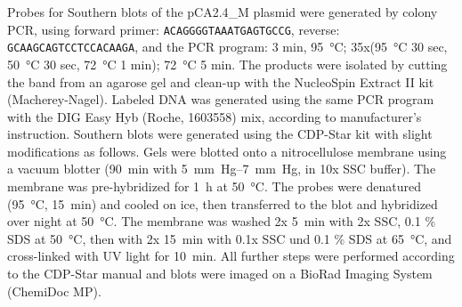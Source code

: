 \documentclass[10pt,a4]{article}
\newcommand{\remove}[1]{}
\begin{document}
Probes for Southern blots of the pCA2.4\_M plasmid were generated by
colony PCR, using forward primer: \texttt{ACAGGGGTAAATGAGTGCCG}, reverse:
\texttt{GCAAGCAGTCCTCCACAAGA}, and the PCR program: 3 min,
\SI{95}{\celsius}; 35x(\SI{95}{\celsius} 30 sec, \SI{50}{\celsius} 30 sec,
\SI{72}{\celsius} 1 min); \SI{72}{\celsius} 5 min.  The products were
isolated by cutting the band from an agarose gel and clean-up with the
NucleoSpin Extract II kit (Macherey-Nagel).  Labeled DNA was
generated using the same PCR program with the DIG Easy Hyb (Roche,
1603558) mix, according to manufacturer's instruction.
%
Southern blots were generated using the CDP-Star kit with slight
modifications as follows.  Gels were blotted onto a nitrocellulose
membrane using a vacuum blotter \remove{model?} (\SI{90}{\minute} with
\SIrange{5}{7}{mm Hg}, in 10x SSC buffer). The membrane was
pre-hybridized for \SI{1}{\hour} at \SI{50}{\celsius}.  The probes
were denatured (\SI{95}{\celsius}, \SI{15}{\minute}) and cooled on ice,
then transferred to the blot and hybridized over night at
\SI{50}{\celsius}. The membrane was washed 2x \SI{5}{\minute} with 2x SSC,
0.1 \% SDS at \SI{50}{\celsius}, then with 2x \SI{15}{\minute} with 0.1x SSC und
0.1 \% SDS at \SI{65}{\celsius}, and cross-linked with UV light
\remove{model} for \SI{10}{\minute}. All further steps were performed
according to the CDP-Star manual and blots were imaged on a
  BioRad Imaging System (ChemiDoc MP).


\end{document}
